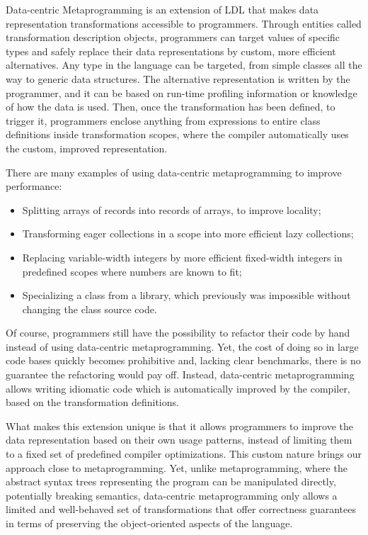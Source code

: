 Data-centric Metaprogramming is an extension of LDL that makes data representation transformations accessible to programmers. Through entities called transformation description objects, programmers can target values of specific types and safely replace their data representations by custom, more efficient alternatives. Any type in the language can be targeted, from simple classes all the way to generic data structures. The alternative representation is written by the programmer, and it can be based on run-time profiling information or knowledge of how the data is used. Then, once the transformation has been defined, to trigger it,  programmers enclose anything from expressions to entire class definitions inside transformation scopes, where the compiler automatically uses the custom, improved representation.

There are many examples of using data-centric metaprogramming to improve performance:
\begin{itemize}
  \item Splitting arrays of records into records of arrays, to improve locality;
  \item Transforming eager collections in a scope into more efficient lazy collections;
  \item Replacing variable-width integers by more efficient fixed-width integers in predefined scopes where numbers are known to fit;
  \item Specializing a class from a library, which previously was impossible without changing the class source code.
\end{itemize}

Of course, programmers still have the possibility to refactor their code by hand instead of using data-centric metaprogramming. Yet, the cost of doing so in large code bases quickly becomes prohibitive and, lacking clear benchmarks, there is no guarantee the refactoring would pay off. Instead, data-centric metaprogramming allows writing idiomatic code which is automatically improved by the compiler, based on the transformation definitions.

What makes this extension unique is that it allows programmers to improve the data representation based on their own usage patterns, instead of limiting them to a fixed set of predefined compiler optimizations. This custom nature brings our approach close to metaprogramming. Yet, unlike metaprogramming, where the abstract syntax trees representing the program can be manipulated directly, potentially breaking semantics, data-centric metaprogramming only allows a limited and well-behaved set of transformations that offer correctness guarantees in terms of preserving the object-oriented aspects of the language.

